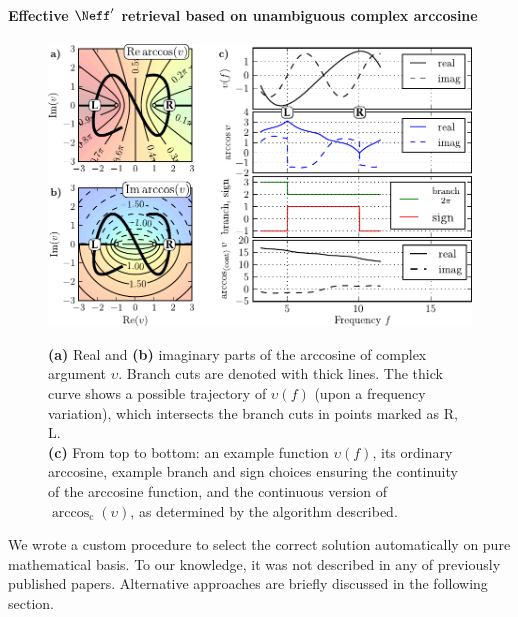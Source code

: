 \paragraph{Effective $\Neff'$ retrieval based on unambiguous complex arccosine} %
\begin{figure} \centering \caption{\textbf{(a)} Real and \textbf{(b)} imaginary parts of the arccosine of complex argument $\upsilon$. Branch cuts are denoted with thick lines. The thick curve shows a possible trajectory of  $\upsilon(f)$ (upon a frequency variation), which intersects the branch cuts in points marked as R, L.\\ \textbf{(c)} From top to bottom: an example function  $\upsilon(f)$, its ordinary arccosine, example branch and sign choices ensuring the continuity of the arccosine function, and the continuous version of $\arccos_{\mathrm{c}}(\upsilon)$, as determined by the algorithm described.} \includegraphics[width=16cm]{img/continuous_arccos/continuous_arccos_new.pdf} \label{fg_arccos}
\end{figure}

We wrote a custom procedure to select the correct solution automatically on pure mathematical basis. To our knowledge, it was not described in any of previously published papers. Alternative approaches are briefly discussed in the following section.

